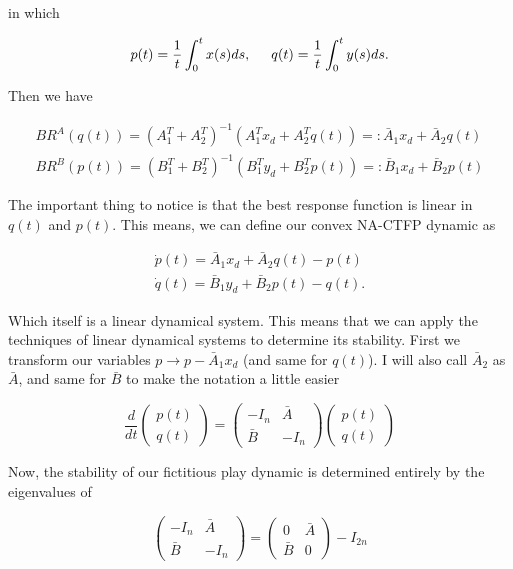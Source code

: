 \documentclass[preprint,12pt]{article}
\theoremstyle{definition}
\theoremstyle{theorem}
\theoremstyle{remark}
\theoremstyle{example}
\begin{document}
	in which 
	
	\begin{equation}
		p(t) = \frac{1}{t} \int_0^t x(s) ds, \hspace{0.5cm} 	q(t) = \frac{1}{t} \int_0^t y(s) ds.
	\end{equation}
	
	Then we have 
	
	\begin{align}
		BR^A(q(t)) = (A_1^T + A_2^T)^{-1} (A_1^T x_d + A_2^T q(t)) =: \bar{A}_1 x_d + \bar{A}_2 q(t) \nonumber \\
		BR^B(p(t)) = (B_1^T + B_2^T)^{-1} (B_1^T y_d + B_2^T p(t)) =: \bar{B}_1 x_d + \bar{B}_2 p(t)
	\end{align}
	
	The important thing to notice is that the best response function is linear in $q(t)$ and $p(t)$. This means, we can define our convex NA-CTFP dynamic as
	
	\begin{align}
		\dot{p}(t) = \bar{A}_1 x_d + \bar{A}_2 q(t) - p(t) \nonumber \\
		\dot{q}(t) = \bar{B}_1 y_d + \bar{B}_2 p(t) - q(t).
	\end{align}
	
	Which itself is a linear dynamical system. This means that we can apply the techniques of linear dynamical systems to determine its stability. First we transform our variables $p \rightarrow p - \bar{A}_1 x_d$ (and same for $q(t)$). I will also call $\bar{A}_2$ as $\bar{A}$, and same for $\bar{B}$ to make the notation a little easier
	
	\begin{equation}
		\frac{d}{dt} \begin{pmatrix}
			p(t) \\ q(t)
		\end{pmatrix} = \begin{pmatrix}
		-I_n & \bar{A} \\ \bar{B} & -I_n
		\end{pmatrix} \begin{pmatrix}
		p(t) \\ q(t)
	\end{pmatrix}
	\end{equation}
	
	Now, the stability of our fictitious play dynamic is determined entirely by the eigenvalues of  
	
		\begin{equation}
		\begin{pmatrix}
			-I_n & \bar{A} \\ \bar{B} & -I_n
		\end{pmatrix} = \begin{pmatrix}
		0 & \bar{A} \\ \bar{B} & 0
	\end{pmatrix} - I_{2n}
	\end{equation}
	
\end{document}
